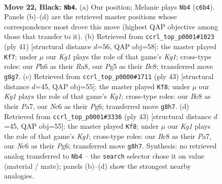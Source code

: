 \documentclass[11pt]{article}
\begin{document}
\clearpage

\begin{figure}[p]\centering
\begin{subfigure}{0.46\textwidth}\centering
\resizebox{\linewidth}{!}{%
\newchessgame
\chessboard[
  setfen={r1b3k1/p1pp4/1pn4p/1N3pp1/8/1P3PP1/P1PPBK1P/R7 b - - 3 22},
  showmover=false,
  pgfstyle=straightmove, color=movearrow, markmove={c6-b4}
]}
\caption{}
\end{subfigure}\hfill
\begin{subfigure}{0.46\textwidth}\centering
\resizebox{\linewidth}{!}{%
\newchessgame
\chessboard[
  setfen={r1b3k1/p5bp/1p2p1p1/1N2P3/2Pp4/8/PP4PP/4RB1K b - - 1 21},
  showmover=false,
  pgfstyle=straightmove, color=movearrow, markmove={g8-f7}
]}
\caption{}
\end{subfigure}
\\[4pt]
\begin{subfigure}{0.46\textwidth}\centering
\resizebox{\linewidth}{!}{%
\newchessgame
\chessboard[
  setfen={4r1k1/p3pp1p/1p2n1p1/3N4/2Pp1P2/6P1/PP2P1KP/5R2 b - - 0 22},
  showmover=false,
  pgfstyle=straightmove, color=movearrow, markmove={g8-f8}
]}
\caption{}
\end{subfigure}\hfill
\begin{subfigure}{0.46\textwidth}\centering
\resizebox{\linewidth}{!}{%
\newchessgame
\chessboard[
  setfen={4r1k1/p3pp1p/1p2n1p1/3N4/2Pp1P2/6P1/PP2P1KP/5R2 b - - 0 22},
  showmover=false,
  pgfstyle=straightmove, color=movearrow, markmove={g8-f8}
]}
\caption{}
\end{subfigure}
\caption{\textbf{Move 22, Black: \texttt{Nb4}.} (a) Our position; Melanie plays \texttt{Nb4} (\texttt{c6b4}). Panels (b)--(d) are the retrieved master positions whose correspondence most drove this move (highest QAP objective among those that transfer to it). (b) Retrieved from \texttt{ccrl\_top\_p0001\#1023} (ply 41) [structural distance $d$=56, QAP obj=58]: the master played \texttt{Kf7}; under $\mu$ our \emph{Kg1} plays the role of that game's \emph{Kg1}; cross-type roles: our \emph{P}h6 as their \emph{R}a8, our \emph{P}g5 as their \emph{B}c8; transferred move \texttt{g8g7}. (c) Retrieved from \texttt{ccrl\_top\_p0000\#1711} (ply 43) [structural distance $d$=45, QAP obj=55]: the master played \texttt{Kf8}; under $\mu$ our \emph{Kg1} plays the role of that game's \emph{Kg1}; cross-type roles: our \emph{B}c8 as their \emph{P}a7, our \emph{N}c6 as their \emph{P}g6; transferred move \texttt{g8h7}. (d) Retrieved from \texttt{ccrl\_top\_p0001\#3336} (ply 43) [structural distance $d$=45, QAP obj=55]: the master played \texttt{Kf8}; under $\mu$ our \emph{Kg1} plays the role of that game's \emph{Kg1}; cross-type roles: our \emph{B}c8 as their \emph{P}a7, our \emph{N}c6 as their \emph{P}g6; transferred move \texttt{g8h7}. Synthesis: no retrieved analog transferred to \texttt{Nb4} -- the \texttt{search} selector chose it on value (material / mate); panels (b)--(d) show the strongest nearby analogies.}
\label{fig:thought-m43}
\end{figure}
\end{document}
